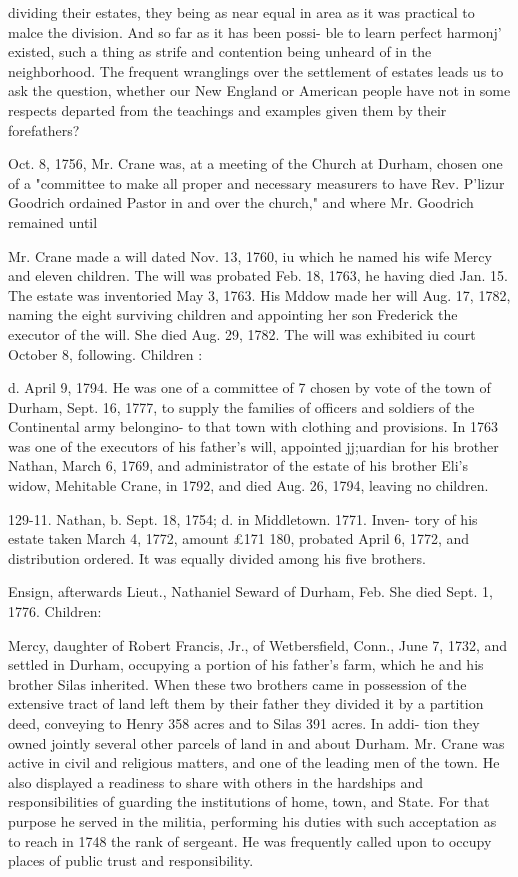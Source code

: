 \documentclass[oneside]{book}
\begin{document}
dividing their estates, they being as near equal in area as it was 
practical to malce the division. And so far as it has been possi- 
ble to learn perfect harmonj' existed, such a thing as strife and 
contention being unheard of in the neighborhood. The frequent 
wranglings over the settlement of estates leads us to ask the 
question, whether our New England or American people have not 
in some respects departed from the teachings and examples given 
them by their forefathers? 

Oct. 8, 1756, Mr. Crane was, at a meeting of the Church at 
Durham, chosen one of a "committee to make all proper and 
necessary measurers to have Rev. P'lizur Goodrich ordained Pastor 
in and over the church," and where Mr. Goodrich remained until 

Mr. Crane made a will dated Nov. 13, 1760, iu which he named 
his wife Mercy and eleven children. The will was probated Feb. 
18, 1763, he having died Jan. 15. The estate was inventoried 
May 3, 1763. His Mddow made her will Aug. 17, 1782, naming 
the eight surviving children and appointing her son Frederick the 
executor of the will. She died Aug. 29, 1782. The will was 
exhibited iu court October 8, following. 
Children : 



d. April 9, 1794. He was one of a committee of 7 chosen 
by vote of the town of Durham, Sept. 16, 1777, to supply 
the families of officers and soldiers of the Continental 
army belongino- to that town with clothing and provisions. 
In 1763 was one of the executors of his father's will, 
appointed jj;uardian for his brother Nathan, March 6, 1769, 
and administrator of the estate of his brother Eli's widow, 
Mehitable Crane, in 1792, and died Aug. 26, 1794, leaving 
no children. 

129-11. Nathan, b. Sept. 18, 1754; d. in Middletown. 1771. Inven- 
tory of his estate taken March 4, 1772, amount £171  180, 
probated April 6, 1772, and distribution ordered. It was 
equally divided among his five brothers. 

Ensign, afterwards Lieut., Nathaniel Seward of Durham, Feb. 
She died Sept. 1, 1776. Children: 








Mercy, daughter of Robert Francis, Jr., of Wetbersfield, Conn., 
June 7, 1732, and settled in Durham, occupying a portion of his 
father's farm, which he and his brother Silas inherited. When 
these two brothers came in possession of the extensive tract of 
land left them by their father they divided it by a partition deed, 
conveying to Henry 358 acres and to Silas 391 acres. In addi- 
tion they owned jointly several other parcels of land in and about 
Durham. Mr. Crane was active in civil and religious matters, 
and one of the leading men of the town. He also displayed a 
readiness to share with others in the hardships and responsibilities 
of guarding the institutions of home, town, and State. For that 
purpose he served in the militia, performing his duties with such 
acceptation as to reach in 1748 the rank of sergeant. He was 
frequently called upon to occupy places of public trust and 
responsibility. 
\end{document}
